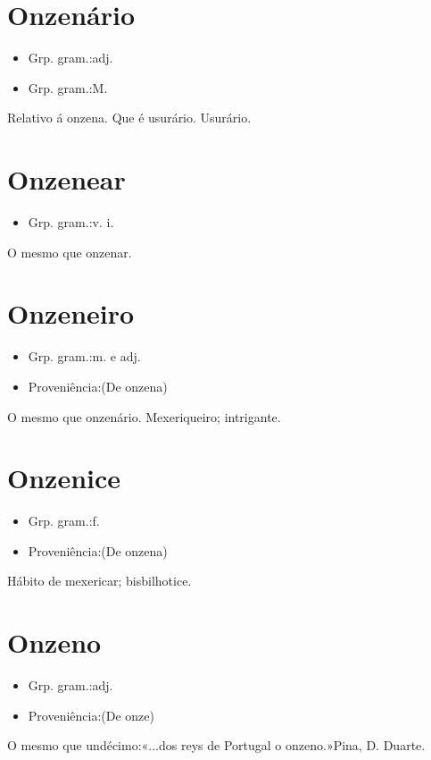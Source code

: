\section{Onzenário}
\begin{itemize}
\item {Grp. gram.:adj.}
\end{itemize}
\begin{itemize}
\item {Grp. gram.:M.}
\end{itemize}
Relativo á onzena.
Que é usurário.
Usurário.
\section{Onzenear}
\begin{itemize}
\item {Grp. gram.:v. i.}
\end{itemize}
O mesmo que \textunderscore onzenar\textunderscore .
\section{Onzeneiro}
\begin{itemize}
\item {Grp. gram.:m.  e  adj.}
\end{itemize}
\begin{itemize}
\item {Proveniência:(De \textunderscore onzena\textunderscore )}
\end{itemize}
O mesmo que \textunderscore onzenário\textunderscore .
Mexeriqueiro; intrigante.
\section{Onzenice}
\begin{itemize}
\item {Grp. gram.:f.}
\end{itemize}
\begin{itemize}
\item {Proveniência:(De \textunderscore onzena\textunderscore )}
\end{itemize}
Hábito de mexericar; bisbilhotice.
\section{Onzeno}
\begin{itemize}
\item {Grp. gram.:adj.}
\end{itemize}
\begin{itemize}
\item {Proveniência:(De \textunderscore onze\textunderscore )}
\end{itemize}
O mesmo que \textunderscore undécimo\textunderscore :«\textunderscore ...dos reys de Portugal o onzeno.\textunderscore »Pina, \textunderscore D. Duarte\textunderscore .
